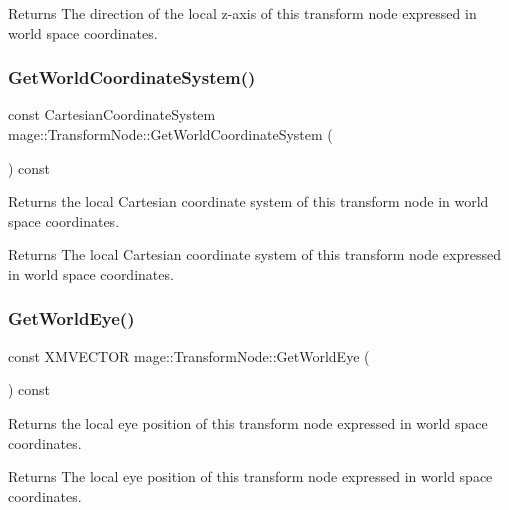 \begin{DoxyReturn}{Returns}
The direction of the local z-\/axis of this transform node expressed in world space coordinates. 
\end{DoxyReturn}
\hypertarget{classmage_1_1_transform_node_ae0347c5fe22cd16da1c6ff727275892d}{}\label{classmage_1_1_transform_node_ae0347c5fe22cd16da1c6ff727275892d} 
\subsubsection{\texorpdfstring{Get\+World\+Coordinate\+System()}{GetWorldCoordinateSystem()}}
{\footnotesize\ttfamily const Cartesian\+Coordinate\+System mage\+::\+Transform\+Node\+::\+Get\+World\+Coordinate\+System (\begin{DoxyParamCaption}{ }\end{DoxyParamCaption}) const}

Returns the local Cartesian coordinate system of this transform node in world space coordinates.

\begin{DoxyReturn}{Returns}
The local Cartesian coordinate system of this transform node expressed in world space coordinates. 
\end{DoxyReturn}
\hypertarget{classmage_1_1_transform_node_abbf6b99c7842fa93eb0ebe881abf4b07}{}\label{classmage_1_1_transform_node_abbf6b99c7842fa93eb0ebe881abf4b07} 
\subsubsection{\texorpdfstring{Get\+World\+Eye()}{GetWorldEye()}}
{\footnotesize\ttfamily const X\+M\+V\+E\+C\+T\+OR mage\+::\+Transform\+Node\+::\+Get\+World\+Eye (\begin{DoxyParamCaption}{ }\end{DoxyParamCaption}) const}

Returns the local eye position of this transform node expressed in world space coordinates.

\begin{DoxyReturn}{Returns}
The local eye position of this transform node expressed in world space coordinates. 
\end{DoxyReturn}
\hypertarget{classmage_1_1_transform_node_a76dbfd8bb65478b3c72e257a67db9791}{}\label{classmage_1_1_transform_node_a76dbfd8bb65478b3c72e257a67db9791} 

